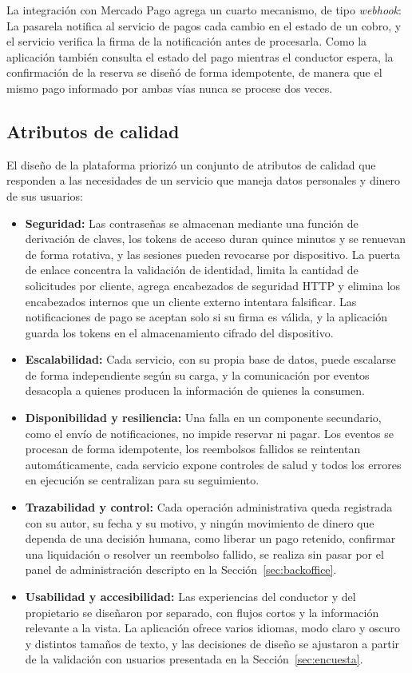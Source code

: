 La integración con Mercado Pago agrega un cuarto mecanismo, de tipo \textit{webhook}: La pasarela notifica al servicio de pagos cada cambio en el estado de un cobro, y el servicio verifica la firma de la notificación antes de procesarla. Como la aplicación también consulta el estado del pago mientras el conductor espera, la confirmación de la reserva se diseñó de forma idempotente, de manera que el mismo pago informado por ambas vías nunca se procese dos veces.

\subsection{Atributos de calidad}

El diseño de la plataforma priorizó un conjunto de atributos de calidad que responden a las necesidades de un servicio que maneja datos personales y dinero de sus usuarios:

\begin{itemize}
    \item \textbf{Seguridad:} Las contraseñas se almacenan mediante una función de derivación de claves, los tokens de acceso duran quince minutos y se renuevan de forma rotativa, y las sesiones pueden revocarse por dispositivo. La puerta de enlace concentra la validación de identidad, limita la cantidad de solicitudes por cliente, agrega encabezados de seguridad HTTP y elimina los encabezados internos que un cliente externo intentara falsificar. Las notificaciones de pago se aceptan solo si su firma es válida, y la aplicación guarda los tokens en el almacenamiento cifrado del dispositivo.
    \item \textbf{Escalabilidad:} Cada servicio, con su propia base de datos, puede escalarse de forma independiente según su carga, y la comunicación por eventos desacopla a quienes producen la información de quienes la consumen.
    \item \textbf{Disponibilidad y resiliencia:} Una falla en un componente secundario, como el envío de notificaciones, no impide reservar ni pagar. Los eventos se procesan de forma idempotente, los reembolsos fallidos se reintentan automáticamente, cada servicio expone controles de salud y todos los errores en ejecución se centralizan para su seguimiento.
    \item \textbf{Trazabilidad y control:} Cada operación administrativa queda registrada con su autor, su fecha y su motivo, y ningún movimiento de dinero que dependa de una decisión humana, como liberar un pago retenido, confirmar una liquidación o resolver un reembolso fallido, se realiza sin pasar por el panel de administración descripto en la Sección~\ref{sec:backoffice}.
    \item \textbf{Usabilidad y accesibilidad:} Las experiencias del conductor y del propietario se diseñaron por separado, con flujos cortos y la información relevante a la vista. La aplicación ofrece varios idiomas, modo claro y oscuro y distintos tamaños de texto, y las decisiones de diseño se ajustaron a partir de la validación con usuarios presentada en la Sección~\ref{sec:encuesta}.
\end{itemize}

